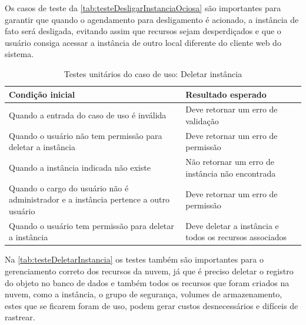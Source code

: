 Os casos de teste da \autoref{tab:testeDesligarInstanciaOciosa} são importantes para garantir que quando o agendamento para desligamento é acionado, a instância de fato será desligada, evitando assim que recursos sejam desperdiçados e que o usuário consiga acessar a instância de outro local diferente do cliente web do sistema.


\begin{table}[h]
\caption{Testes unitários do caso de uso: Deletar instância}
\label{tab:testeDeletarInstancia}
\begin{tabularx}{\textwidth}{p{} p{}}
\toprule
\textbf{Condição inicial} & \textbf{Resultado esperado} \\ \midrule

Quando a entrada do caso de uso é inválida & Deve retornar um erro de validação \\ \hline

Quando o usuário não tem permissão para deletar a instância & Deve retornar um erro de permissão \\ \hline

Quando a instância indicada não existe & Não retornar um erro de instância não encontrada \\ \hline

Quando o cargo do usuário não é administrador e a instância pertence a outro usuário & Deve retornar um erro de permissão \\ \hline

Quando o usuário tem permissão para deletar a instância & Deve deletar a instância e todos os recursos associados \\

\bottomrule
\end{tabularx}
\end{table}

Na \autoref{tab:testeDeletarInstancia} os testes também são importantes para o gerenciamento correto dos recursos da nuvem, já que é preciso deletar o registro do objeto no banco de dados e também todos os recursos que foram criados na nuvem, como a instância, o grupo de segurança, volumes de armazenamento, estes que se ficarem foram de uso, podem gerar custos desnecessários e difíceis de rastrear.


